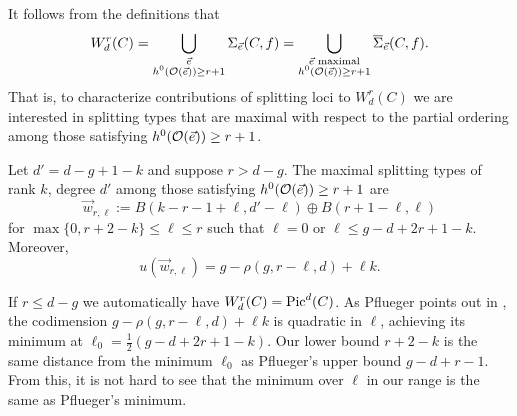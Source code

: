 It follows from the definitions that
\begin{equation} \label{weq}\dcref{2.2}
\source{refined-brill-noether-theory-hurwitz-spaces}
W^r_d(C) = \bigcup_{\substack{\vec{e} \\ h^0(\O(\vec{e})) \geq r+1}} \Sigma_{\vec{e}}(C, f) = \bigcup_{\substack{\vec{e} \text{ maximal}\\ h^0(\O(\vec{e})) \geq r+1}} \overline{\Sigma}_{\vec{e}}(C, f).
\end{equation}
That is, to characterize contributions of splitting loci to $W^r_d(C)$ we are interested in splitting types that are maximal with respect to the partial ordering among those satisfying $h^0(\mathcal{O}(\vec{e}))\geq r+1$.

\begin{Lemma}
\notready \label{wlem}
Let $d' = d - g + 1 - k$ and suppose $r > d - g$.
The maximal splitting types of rank $k$, degree $d'$ among those satisfying $h^0(\mathcal{O}(\vec{e}))\geq r+1$
are
\[\vec{w}_{r,\ell} := B(k-r-1+\ell, d'-\ell) \oplus B(r+1-\ell, \ell)\]
for $\max\{0, r+2-k\} \leq \ell \leq r$ such that $\ell = 0$ or $\ell \leq g - d + 2r + 1 - k$. Moreover,
\[u(\vec{w}_{r, \ell}) = g - \rho(g, r-\ell, d) + \ell k.\]
\end{Lemma}
\begin{remark}
\notready
If $r \leq d - g$ we automatically have $W^r_d(C) = \operatorname{Pic}^d(C)$.
As Pflueger points out in \cite[Remarks 1.6 and 3.2]{Pf},  the codimension $g - \rho(g, r-\ell, d) + \ell k$ is quadratic in $\ell$, achieving its minimum at $\ell_0 = \frac{1}{2}(g - d +2r + 1-k)$.
Our lower bound $r + 2 - k$ is the same distance from the minimum $\ell_0$ as Pflueger's upper bound $g - d + r - 1$. From this, it is not hard to see that the minimum over $\ell$ in our range is the same as Pflueger's minimum.
\end{remark}
